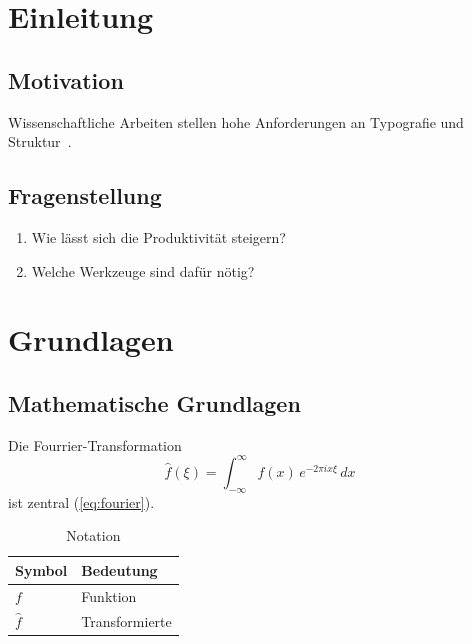 \chapter{Einleitung}
\label{chap:einleitung}

\section{Motivation}
\label{sec:motivation}
Wissenschaftliche Arbeiten stellen hohe Anforderungen an Typografie und
Struktur~\cite{lamport1994}.

\section{Fragenstellung}
\label{sec:fragenstellung}
\begin{enumerate}
  \item Wie lässt sich die Produktivität steigern?
  \item Welche Werkzeuge sind dafür nötig?
\end{enumerate}

\chapter{Grundlagen}
\label{chap:grundlagen}

\section{Mathematische Grundlagen}
\label{sec:mathematik}
Die Fourrier-Transformation
\begin{equation}
  \label{eq:fourier}
  \hat{f}(\xi) = \int_{-\infty}^{\infty} f(x)\, e^{-2\pi i x\xi}\,dx
\end{equation}
ist zentral (\cref{eq:fourier}).

\begin{table}[htbp]
  \centering
  \caption{Notation}
  \label{tab:notation}
  \begin{tabular}{ll}
    \toprule
    Symbol & Bedeutung \\
    \midrule
    $f$ & Funktion \\
    $\hat{f}$ & Transformierte \\
    \bottomrule
  \end{tabular}
\end{table}

